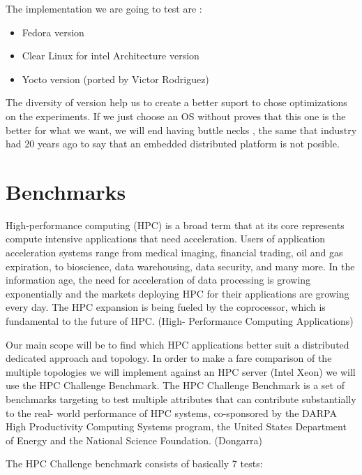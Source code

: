 The implementation we are going to test are : 

\begin{itemize}
    \item Fedora version
    \item Clear Linux for intel Architecture version
    \item Yocto version (ported by Victor Rodriguez)
\end{itemize}

The diversity of version help us to create a better suport to chose
optimizations on the experiments. If we just choose an OS without proves that
this one is the better for what we want, we will end having buttle necks , the
same that industry had 20 years ago to say that an embedded distributed
platform is not posible.


\section{Benchmarks}
\noindent


High-performance computing (HPC) is a broad term that at its core represents
compute intensive applications that need acceleration. Users of application
acceleration systems range from medical imaging, financial trading, oil and gas
expiration, to bioscience, data warehousing, data security, and many more. In
the information age, the need for acceleration of data processing is growing
exponentially and the markets deploying HPC for their applications are growing
every day. The HPC expansion is being fueled by the coprocessor, which is
fundamental to the future of HPC. (High- Performance Computing Applications)

Our main scope will be to find which HPC applications better suit a distributed
dedicated approach and topology.
In order to make a fare comparison of the multiple topologies we will implement
against an HPC server (Intel Xeon) we will use the HPC Challenge Benchmark. The
HPC Challenge Benchmark is a set of benchmarks targeting to test multiple
attributes that can contribute substantially to the real- world performance of
HPC systems, co-sponsored by the DARPA High Productivity Computing Systems
program, the United States Department of Energy and the National Science
Foundation. (Dongarra)

The HPC Challenge benchmark consists of basically 7 tests:


